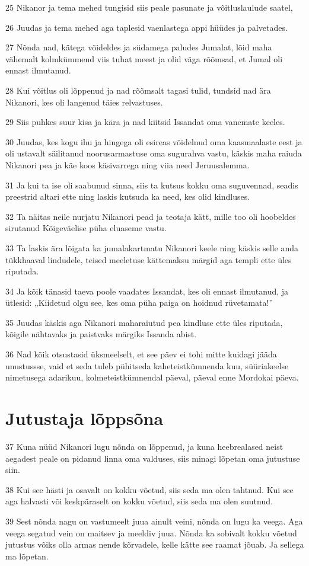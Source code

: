 \par 25 Nikanor ja tema mehed tungisid siis peale pasunate ja võitluslaulude saatel,
\par 26 Juudas ja tema mehed aga taplesid vaenlastega appi hüüdes ja palvetades.
\par 27 Nõnda nad, kätega võideldes ja südamega paludes Jumalat, lõid maha vähemalt kolmkümmend viis tuhat meest ja olid väga rõõmsad, et Jumal oli ennast ilmutanud.
\par 28 Kui võitlus oli lõppenud ja nad rõõmsalt tagasi tulid, tundsid nad ära Nikanori, kes oli langenud täies relvastuses.
\par 29 Siis puhkes suur kisa ja kära ja nad kiitsid Issandat oma vanemate keeles.
\par 30 Juudas, kes kogu ihu ja hingega oli esireas võidelnud oma kaasmaalaste eest ja oli ustavalt säilitanud noorusarmastuse oma sugurahva vastu, käskis maha raiuda Nikanori pea ja käe koos käsivarrega ning viia need Jeruusalemma.
\par 31 Ja kui ta ise oli saabunud sinna, siis ta kutsus kokku oma suguvennad, seadis preestrid altari ette ning laskis kutsuda ka need, kes olid kindluses.
\par 32 Ta näitas neile nurjatu Nikanori pead ja teotaja kätt, mille too oli hoobeldes sirutanud Kõigeväelise püha eluaseme vastu.
\par 33 Ta laskis ära lõigata ka jumalakartmatu Nikanori keele ning käskis selle anda tükkhaaval lindudele, teised meeletuse kättemaksu märgid aga templi ette üles riputada.
\par 34 Ja kõik tänasid taeva poole vaadates Issandat, kes oli ennast ilmutanud, ja ütlesid: „Kiidetud olgu see, kes oma püha paiga on hoidnud rüvetamata!”
\par 35 Juudas käskis aga Nikanori maharaiutud pea kindluse ette üles riputada, kõigile nähtavaks ja paistvaks märgiks Issanda abist.
\par 36 Nad kõik otsustasid üksmeelselt, et see päev ei tohi mitte kuidagi jääda unustussse, vaid et seda tuleb pühitseda kaheteistkümnenda kuu, süüriakeelse nimetusega adarikuu, kolmeteistkümnendal päeval, päeval enne Mordokai päeva.


\section*{Jutustaja lõppsõna}

\par 37 Kuna nüüd Nikanori lugu nõnda on lõppenud, ja kuna heebrealased neist aegadest peale on pidanud linna oma valduses, siis minagi lõpetan oma jutustuse siin.
\par 38 Kui see hästi ja osavalt on kokku võetud, siis seda ma olen tahtnud. Kui see aga halvasti või keskpäraselt on kokku võetud, siis seda ma olen suutnud.
\par 39 Sest nõnda nagu on vastumeelt juua ainult veini, nõnda on lugu ka veega. Aga veega segatud vein on maitsev ja meeldiv juua. Nõnda ka sobivalt kokku võetud jutustus võiks olla armas nende kõrvadele, kelle kätte see raamat jõuab. Ja sellega ma lõpetan.







